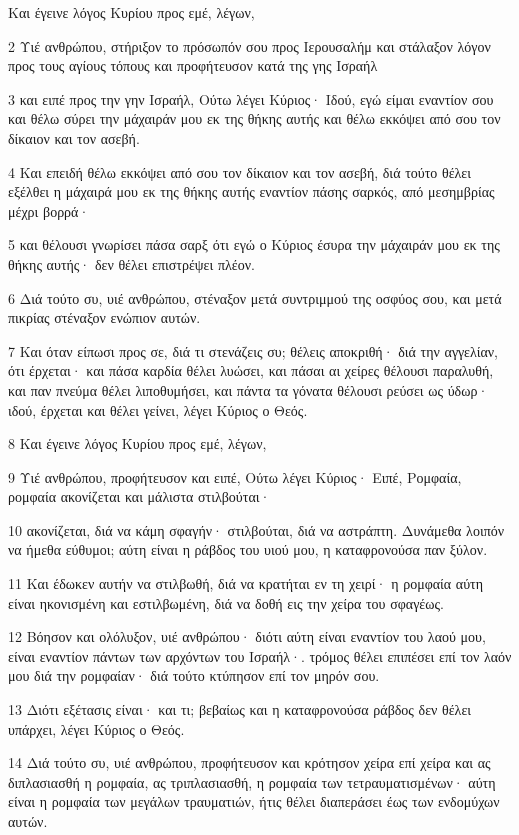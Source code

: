 \par Και έγεινε λόγος Κυρίου προς εμέ, λέγων,
\par 2 Υιέ ανθρώπου, στήριξον το πρόσωπόν σου προς Ιερουσαλήμ και στάλαξον λόγον προς τους αγίους τόπους και προφήτευσον κατά της γης Ισραήλ
\par 3 και ειπέ προς την γην Ισραήλ, Ούτω λέγει Κύριος· Ιδού, εγώ είμαι εναντίον σου και θέλω σύρει την μάχαιράν μου εκ της θήκης αυτής και θέλω εκκόψει από σου τον δίκαιον και τον ασεβή.
\par 4 Και επειδή θέλω εκκόψει από σου τον δίκαιον και τον ασεβή, διά τούτο θέλει εξέλθει η μάχαιρά μου εκ της θήκης αυτής εναντίον πάσης σαρκός, από μεσημβρίας μέχρι βορρά·
\par 5 και θέλουσι γνωρίσει πάσα σαρξ ότι εγώ ο Κύριος έσυρα την μάχαιράν μου εκ της θήκης αυτής· δεν θέλει επιστρέψει πλέον.
\par 6 Διά τούτο συ, υιέ ανθρώπου, στέναξον μετά συντριμμού της οσφύος σου, και μετά πικρίας στέναξον ενώπιον αυτών.
\par 7 Και όταν είπωσι προς σε, διά τι στενάζεις συ; θέλεις αποκριθή· διά την αγγελίαν, ότι έρχεται· και πάσα καρδία θέλει λυώσει, και πάσαι αι χείρες θέλουσι παραλυθή, και παν πνεύμα θέλει λιποθυμήσει, και πάντα τα γόνατα θέλουσι ρεύσει ως ύδωρ· ιδού, έρχεται και θέλει γείνει, λέγει Κύριος ο Θεός.
\par 8 Και έγεινε λόγος Κυρίου προς εμέ, λέγων,
\par 9 Υιέ ανθρώπου, προφήτευσον και ειπέ, Ούτω λέγει Κύριος· Ειπέ, Ρομφαία, ρομφαία ακονίζεται και μάλιστα στιλβούται·
\par 10 ακονίζεται, διά να κάμη σφαγήν· στιλβούται, διά να αστράπτη. Δυνάμεθα λοιπόν να ήμεθα εύθυμοι; αύτη είναι η ράβδος του υιού μου, η καταφρονούσα παν ξύλον.
\par 11 Και έδωκεν αυτήν να στιλβωθή, διά να κρατήται εν τη χειρί· η ρομφαία αύτη είναι ηκονισμένη και εστιλβωμένη, διά να δοθή εις την χείρα του σφαγέως.
\par 12 Βόησον και ολόλυξον, υιέ ανθρώπου· διότι αύτη είναι εναντίον του λαού μου, είναι εναντίον πάντων των αρχόντων του Ισραήλ·. τρόμος θέλει επιπέσει επί τον λαόν μου διά την ρομφαίαν· διά τούτο κτύπησον επί τον μηρόν σου.
\par 13 Διότι εξέτασις είναι· και τι; βεβαίως και η καταφρονούσα ράβδος δεν θέλει υπάρχει, λέγει Κύριος ο Θεός.
\par 14 Διά τούτο συ, υιέ ανθρώπου, προφήτευσον και κρότησον χείρα επί χείρα και ας διπλασιασθή η ρομφαία, ας τριπλασιασθή, η ρομφαία των τετραυματισμένων· αύτη είναι η ρομφαία των μεγάλων τραυματιών, ήτις θέλει διαπεράσει έως των ενδομύχων αυτών.
